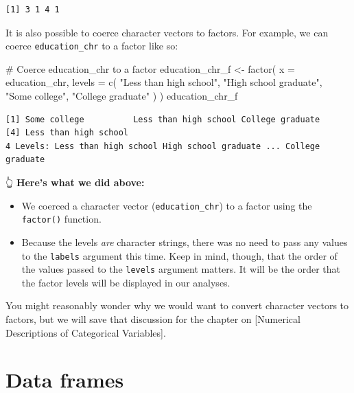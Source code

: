 \documentclass[
  letterpaper,
  DIV=11,
  numbers=noendperiod]{scrreprt}
\newenvironment{Shaded}{\begin{snugshade}}{\end{snugshade}}
\newcommand{\AttributeTok}[1]{\textcolor[rgb]{0.40,0.45,0.13}{#1}}
\newcommand{\CommentTok}[1]{\textcolor[rgb]{0.37,0.37,0.37}{#1}}
\newcommand{\FunctionTok}[1]{\textcolor[rgb]{0.28,0.35,0.67}{#1}}
\newcommand{\NormalTok}[1]{\textcolor[rgb]{0.00,0.23,0.31}{#1}}
\newcommand{\OtherTok}[1]{\textcolor[rgb]{0.00,0.23,0.31}{#1}}
\newcommand{\StringTok}[1]{\textcolor[rgb]{0.13,0.47,0.30}{#1}}
\begin{document}
\begin{verbatim}
[1] 3 1 4 1
\end{verbatim}

It is also possible to coerce character vectors to factors. For example,
we can coerce \texttt{education\_chr} to a factor like so:

\begin{Shaded}
\begin{Highlighting}[]
\CommentTok{\# Coerce education\_chr to a factor}
\NormalTok{education\_chr\_f }\OtherTok{\textless{}{-}} \FunctionTok{factor}\NormalTok{(}
  \AttributeTok{x      =}\NormalTok{ education\_chr,}
  \AttributeTok{levels =} \FunctionTok{c}\NormalTok{(}
    \StringTok{"Less than high school"}\NormalTok{, }\StringTok{"High school graduate"}\NormalTok{, }\StringTok{"Some college"}\NormalTok{, }
    \StringTok{"College graduate"}
\NormalTok{  )}
\NormalTok{)}
\NormalTok{education\_chr\_f}
\end{Highlighting}
\end{Shaded}

\begin{verbatim}
[1] Some college          Less than high school College graduate     
[4] Less than high school
4 Levels: Less than high school High school graduate ... College graduate
\end{verbatim}

👆 \textbf{Here's what we did above:}

\begin{itemize}
\item
  We coerced a character vector (\texttt{education\_chr}) to a factor
  using the \texttt{factor()} function.
\item
  Because the levels \emph{are} character strings, there was no need to
  pass any values to the \texttt{labels} argument this time. Keep in
  mind, though, that the order of the values passed to the
  \texttt{levels} argument matters. It will be the order that the factor
  levels will be displayed in our analyses.
\end{itemize}

You might reasonably wonder why we would want to convert character
vectors to factors, but we will save that discussion for the chapter on
{[}Numerical Descriptions of Categorical Variables{]}.

\section{Data frames}\label{data-frames}
\end{document}
